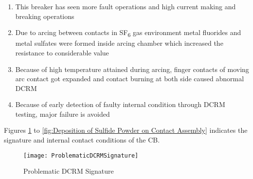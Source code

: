 \begin{enumerate}
\item This breaker has seen more fault operations and high current making and breaking operations

\item Due to arcing between contacts in SF\textsubscript{6} gas environment metal fluorides and metal sulfates were formed inside arcing chamber which increased the resistance to considerable value

\item Because of high temperature attained during arcing, finger contacts of moving arc contact got expanded and contact burning at both side caused abnormal DCRM

\item Because of early detection of faulty internal condition through DCRM testing, major failure is avoided
\end{enumerate}

Figures \ref{fig:Problematic DCRM Signature} to \ref{fig:Deposition of Sulfide Powder on Contact Assembly} indicates the signature and internal contact conditions of the CB.

\begin{figure}[!htbp]
    \centering
    \texttt{[image: ProblematicDCRMSignature]}
    \caption{Problematic DCRM Signature}
    \label{fig:Problematic DCRM Signature}
\end{figure}

